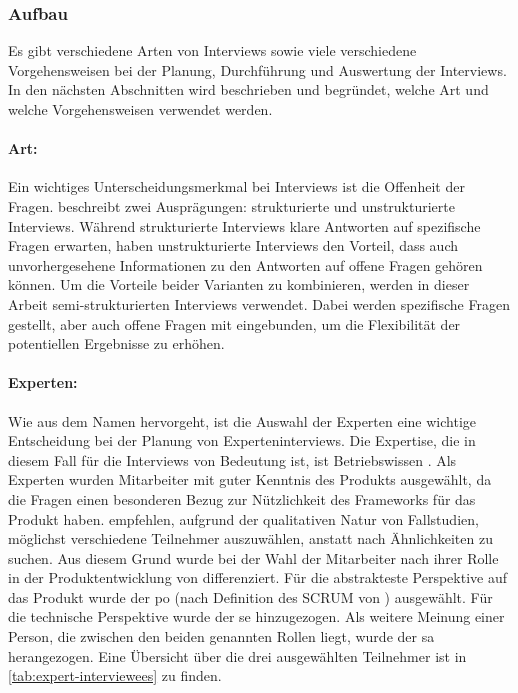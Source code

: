 \subsubsection{Aufbau}
Es gibt verschiedene Arten von Interviews sowie viele verschiedene Vorgehensweisen bei der Planung, Durchführung und Auswertung der Interviews.
In den nächsten Abschnitten wird beschrieben und begründet, welche Art und welche Vorgehensweisen verwendet werden.

\paragraph{Art:} Ein wichtiges Unterscheidungsmerkmal bei Interviews ist die Offenheit der Fragen.
 beschreibt zwei Ausprägungen: strukturierte und unstrukturierte Interviews.
Während struk\-tu\-rier\-te Interviews klare Antworten auf spezifische Fragen erwarten, haben unstrukturierte Interviews den Vorteil, dass auch unvorhergesehene Informationen zu den Antworten auf offene Fragen gehören können.
Um die Vorteile beider Varianten zu kombinieren, werden in dieser Arbeit semi-strukturierten Interviews \cite{seaman2008qualitative} verwendet.
Dabei werden spezifische Fragen gestellt, aber auch offene Fragen mit eingebunden, um die Flexibilität der potentiellen Ergebnisse zu erhöhen.

\paragraph{Experten:} Wie aus dem Namen hervorgeht, ist die Auswahl der Experten eine wichtige Entscheidung bei der Planung von Experteninterviews.
Die Expertise, die in diesem Fall für die Interviews von Bedeutung ist, ist \glqq Betriebswissen\grqq{} \cite{Meuser2009}.
Als Experten wurden Mitarbeiter mit guter Kenntnis des Produkts \jf ausgewählt, da die Fragen einen besonderen Bezug zur Nützlichkeit des Frameworks für das Produkt haben.
 empfehlen, aufgrund der qualitativen Natur von Fallstudien, möglichst verschiedene Teilnehmer auszuwählen, anstatt nach Ähnlichkeiten zu suchen.
Aus diesem Grund wurde bei der Wahl der Mitarbeiter nach ihrer Rolle in der Produktentwicklung von \jf differenziert.
Für die abstrakteste Perspektive auf das Produkt wurde der \acrlong{po} (nach Definition des SCRUM von ) ausgewählt.
Für die technische Perspektive wurde der \gls{se} hinzugezogen.
Als weitere Meinung einer Person, die zwischen den beiden genannten Rollen liegt, wurde der \gls{sa} herangezogen.
Eine Übersicht über die drei ausgewählten Teilnehmer ist in \cref{tab:expert-interviewees} zu finden.


